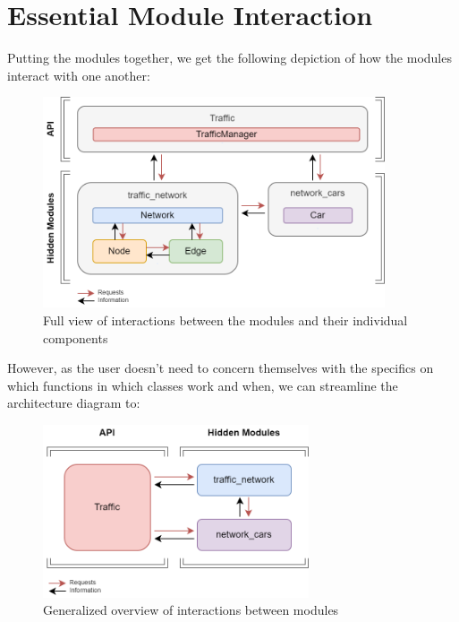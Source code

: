 \section{Essential Module Interaction}

\par Putting the modules together, we get the following depiction of how the modules interact with one another:

\begin{figure}[H]
    \centering
	\includegraphics[width=0.9\textwidth]{tex files/Figures/detailed_essentials.png}
	\caption[Software Interaction:  Full View]{Full view of interactions between the modules and their individual components}
	\label{fig:interactions_detailed}
\end{figure}

\noindent  However, as the user doesn't need to concern themselves with the specifics on which functions in which classes work and when, we can streamline the architecture diagram to:

\begin{figure}[H]
    \centering
	\includegraphics[width=0.7\textwidth]{tex files/Figures/simplified_essentials.png}
	\caption[Software Interaction:  User View]{Generalized overview of interactions between modules}
	\label{fig:interactions_simplified}
\end{figure}



